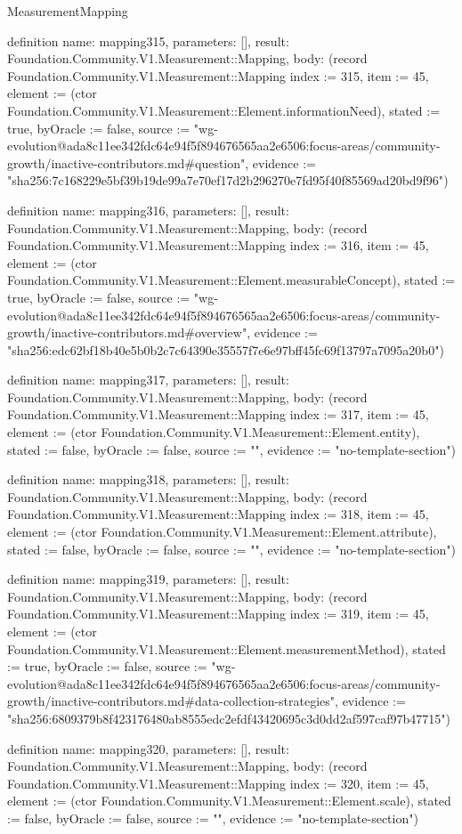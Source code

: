 \begin{lexlean}{MeasurementMapping}
\begin{semanticmodule}
definition{
  name: mapping315,
  parameters: [],
  result: Foundation.Community.V1.Measurement::Mapping,
  body: (record Foundation.Community.V1.Measurement::Mapping {index := 315, item := 45, element := (ctor Foundation.Community.V1.Measurement::Element.informationNeed), stated := true, byOracle := false, source := "wg-evolution@ada8c11ee342fdc64e94f5f894676565aa2e6506:focus-areas/community-growth/inactive-contributors.md#question", evidence := "sha256:7c168229e5bf39b19de99a7e70ef17d2b296270e7fd95f40f85569ad20bd9f96"})
}

definition{
  name: mapping316,
  parameters: [],
  result: Foundation.Community.V1.Measurement::Mapping,
  body: (record Foundation.Community.V1.Measurement::Mapping {index := 316, item := 45, element := (ctor Foundation.Community.V1.Measurement::Element.measurableConcept), stated := true, byOracle := false, source := "wg-evolution@ada8c11ee342fdc64e94f5f894676565aa2e6506:focus-areas/community-growth/inactive-contributors.md#overview", evidence := "sha256:edc62bf18b40e5b0b2c7c64390e35557f7e6e97bff45fc69f13797a7095a20b0"})
}

definition{
  name: mapping317,
  parameters: [],
  result: Foundation.Community.V1.Measurement::Mapping,
  body: (record Foundation.Community.V1.Measurement::Mapping {index := 317, item := 45, element := (ctor Foundation.Community.V1.Measurement::Element.entity), stated := false, byOracle := false, source := "", evidence := "no-template-section"})
}

definition{
  name: mapping318,
  parameters: [],
  result: Foundation.Community.V1.Measurement::Mapping,
  body: (record Foundation.Community.V1.Measurement::Mapping {index := 318, item := 45, element := (ctor Foundation.Community.V1.Measurement::Element.attribute), stated := false, byOracle := false, source := "", evidence := "no-template-section"})
}

definition{
  name: mapping319,
  parameters: [],
  result: Foundation.Community.V1.Measurement::Mapping,
  body: (record Foundation.Community.V1.Measurement::Mapping {index := 319, item := 45, element := (ctor Foundation.Community.V1.Measurement::Element.measurementMethod), stated := true, byOracle := false, source := "wg-evolution@ada8c11ee342fdc64e94f5f894676565aa2e6506:focus-areas/community-growth/inactive-contributors.md#data-collection-strategies", evidence := "sha256:6809379b8f423176480ab8555edc2efdf43420695c3d0dd2af597caf97b47715"})
}

definition{
  name: mapping320,
  parameters: [],
  result: Foundation.Community.V1.Measurement::Mapping,
  body: (record Foundation.Community.V1.Measurement::Mapping {index := 320, item := 45, element := (ctor Foundation.Community.V1.Measurement::Element.scale), stated := false, byOracle := false, source := "", evidence := "no-template-section"})
}


\end{semanticmodule}
\end{lexlean}
